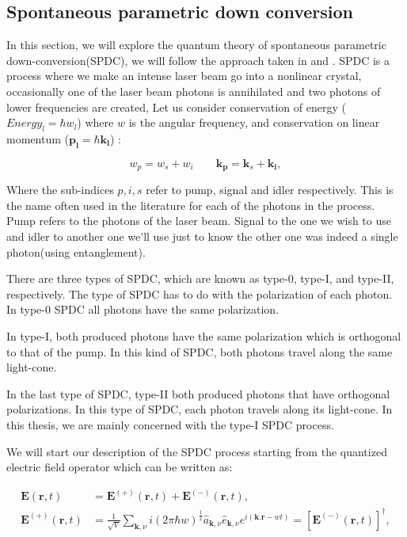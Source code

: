 \documentclass[12pt]{article}
\begin{document}
\subsection{Spontaneous parametric down conversion}

In this section, we will explore the quantum theory of spontaneous parametric down-conversion(SPDC), we will follow the approach taken in \cite{procopio} and \cite{multiphoton}. SPDC is a process where we make an intense laser beam go into a nonlinear crystal, occasionally one of the laser beam photons is annihilated and two photons of lower frequencies are created, Let us consider conservation of energy ($Energy_{l}=\hbar w_{l}$) where $w$ is the angular frequency, and conservation on linear momentum ($\mathbf{p_{l}}=\hbar \mathbf{k_{l}}$) :

\begin{equation}
w_{p}=w_{s}+w_{i} \qquad \mathbf{k_{p}}=\mathbf{k}_{s}+\mathbf{k_{i}},
\label{conservation}
\end{equation}

Where the sub-indices $p, i,s$ refer to pump, signal and idler respectively. This is the name often used in the literature for each of the photons in the process. Pump refers to the photons of the laser beam. Signal to the one we wish to use and idler to another one we'll use just to know the other one was indeed a single photon(using entanglement).

There are three types of SPDC, which are known as type-0, type-I, and type-II, respectively. The type of SPDC has to do with the polarization of each photon. In type-0 SPDC all photons have the same polarization.

In type-I, both produced photons have the same polarization which is orthogonal to that of the pump. In this kind of SPDC, both photons travel along the same light-cone.

In the last type of SPDC, type-II both produced photons that have orthogonal polarizations. In this type of SPDC, each photon travels along its light-cone. In this thesis, we are mainly concerned with the type-I SPDC process.

We will start our description of the SPDC process starting from the quantized electric field operator which can be written as:

\begin{align}
\textbf{E}(\textbf{r},t)&=\textbf{E}^{(+)} (\textbf{r},t) + \textbf{E}^{(-)} (\textbf{r},t),\\
\textbf{E}^{(+)} (\textbf{r},t)&=\frac{1}{\sqrt{V}} \sum_{\textbf{k},\nu} i(2 \pi \hbar w)^{\frac{1}{2}} \hat{a}_{\textbf{k},\nu} \hat{e}_{\textbf{k},\nu} e^{i(\textbf{k.r}-wt)}=[\textbf{E}^{(-)} (\textbf{r},t)]^{\dagger},
\end{align}
\end{document}
